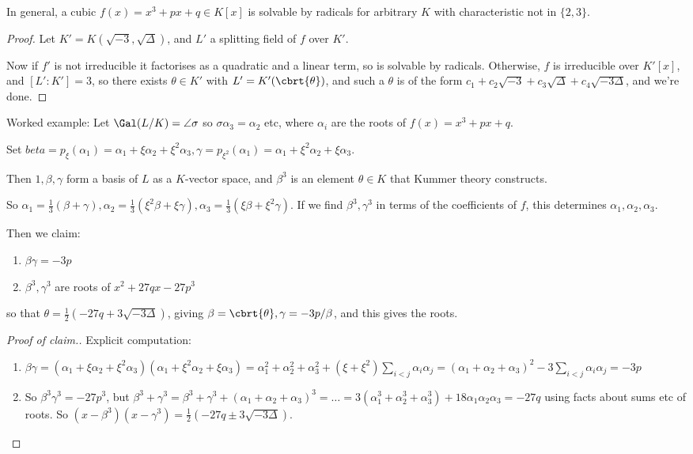 \documentclass[a4paper, 10pt, twocolumn]{amsart}
\begin{document}
In general, a cubic $f(x) = x^3 + px + q \in K[x]$ is solvable by radicals for arbitrary $K$ with characteristic not in $\{2,3\}$.

\begin{proof}
Let $K' = K(\sqrt{-3}, \sqrt{\Delta})$, and $L'$ a splitting field of $f$ over $K'$.

Now if $f'$ is not irreducible it factorises as a quadratic and a linear term, so is solvable by radicals. Otherwise, $f$ is irreducible over $K'[x]$, and $[L':K'] = 3$, so there exists $\theta \in K'$ with $L' = K'(\cbrt{\theta})$, and such a $\theta$ is of the form $c_1 + c_2\sqrt{-3} +c_3\sqrt{\Delta} + c_4\sqrt{-3\Delta}$, and we're done.
\end{proof}

Worked example: Let $\Gal(L/K) = \angle{\sigma}$ so $\sigma \alpha_3 = \alpha_2$ etc, where $\alpha_i$ are the roots of $f(x) = x^3+px+q$.

Set $beta = p_\xi(\alpha_1) = \alpha_1 + \xi \alpha_2 + \xi^2 \alpha_3, \gamma = p_{\xi^2}(\alpha_1) = \alpha_1 + \xi^2 \alpha_2 + \xi \alpha_3$.

Then $1, \beta, \gamma$ form a basis of $L$ as a $K$-vector space, and $\beta^3$ is an element $\theta \in K$ that Kummer theory constructs.

So $\alpha_1 = \frac{1}{3}(\beta+\gamma), \alpha_2 = \frac{1}{3}(\xi^2\beta + \xi\gamma), \alpha_3 = \frac{1}{3}(\xi\beta + \xi^2\gamma)$. If we find $\beta^3, \gamma^3$ in terms of the coefficients of $f$, this determines $\alpha_1, \alpha_2, \alpha_3$.

Then we claim:
\begin{enumerate}
\item $\beta \gamma = -3p$
\item $\beta^3, \gamma^3$ are roots of $x^2+27qx-27p^3$
\end{enumerate}
so that $\theta = \frac{1}{2}(-27q+3\sqrt{-3\Delta})$, giving $\beta = \cbrt{\theta}, \gamma = -3p/\beta$, and this gives the roots.

\begin{proof}[Proof of claim.]
Explicit computation:
\begin{enumerate}
\item $\beta\gamma = (\alpha_1 + \xi \alpha_2+ \xi^2\alpha_3)(\alpha_1+\xi^2\alpha_2+\xi\alpha_3) = \alpha_1^2 + \alpha_2^2 + \alpha_3^2 + (\xi+\xi^2)\sum_{i<j}\alpha_i\alpha_j = (\alpha_1+\alpha_2+\alpha_3)^2 - 3\sum_{i<j} \alpha_i\alpha_j = -3p$

\item So $\beta^3\gamma^3 = -27p^3$, but $\beta^3+\gamma^3 = \beta^3+\gamma^3 + (\alpha_1+\alpha_2+\alpha_3)^3 = \ldots = 3(\alpha_1^3+\alpha_2^3+\alpha_3^3) + 18\alpha_1\alpha_2\alpha_3 = -27q$ using facts about sums etc of roots. So $(x-\beta^3)(x-\gamma^3) = \frac{1}{2}(-27q \pm 3\sqrt{-3\Delta})$.
\end{enumerate}
\end{proof}
\end{document}
